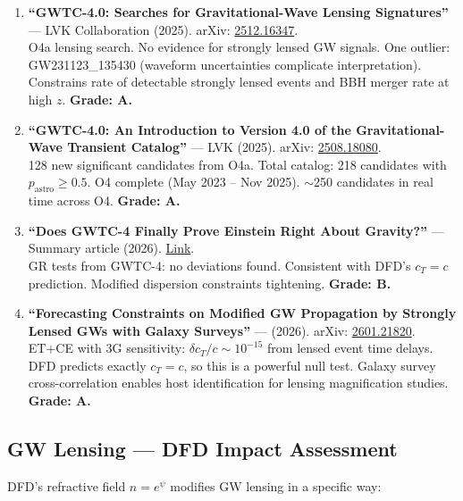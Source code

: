 \documentclass[11pt,a4paper]{article}
\begin{document}
\begin{enumerate}
\item \textbf{``GWTC-4.0: Searches for Gravitational-Wave Lensing Signatures''} --- LVK Collaboration (2025). arXiv: \href{https://arxiv.org/abs/2512.16347}{2512.16347}.\\
O4a lensing search. No evidence for strongly lensed GW signals. One outlier: GW231123\_135430 (waveform uncertainties complicate interpretation). Constrains rate of detectable strongly lensed events and BBH merger rate at high $z$. \textbf{Grade: A.}

\item \textbf{``GWTC-4.0: An Introduction to Version 4.0 of the Gravitational-Wave Transient Catalog''} --- LVK (2025). arXiv: \href{https://arxiv.org/abs/2508.18080}{2508.18080}.\\
128 new significant candidates from O4a. Total catalog: 218 candidates with $p_\mathrm{astro} \geq 0.5$. O4 complete (May 2023 -- Nov 2025). $\sim$250 candidates in real time across O4. \textbf{Grade: A.}

\item \textbf{``Does GWTC-4 Finally Prove Einstein Right About Gravity?''} --- Summary article (2026). \href{https://www.freeastroscience.com/2026/03/does-gwtc-4-finally-prove-einstein.html}{Link}.\\
GR tests from GWTC-4: no deviations found. Consistent with DFD's $c_T = c$ prediction. Modified dispersion constraints tightening. \textbf{Grade: B.}

\item \textbf{``Forecasting Constraints on Modified GW Propagation by Strongly Lensed GWs with Galaxy Surveys''} --- (2026). arXiv: \href{https://arxiv.org/abs/2601.21820}{2601.21820}.\\
ET+CE with 3G sensitivity: $\delta c_T / c \sim 10^{-15}$ from lensed event time delays. DFD predicts exactly $c_T = c$, so this is a powerful null test. Galaxy survey cross-correlation enables host identification for lensing magnification studies. \textbf{Grade: A.}
\end{enumerate}

\subsection{GW Lensing --- DFD Impact Assessment}

DFD's refractive field $n = e^\psi$ modifies GW lensing in a specific way:
\end{document}
